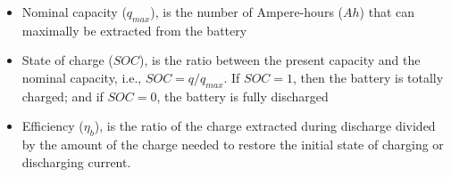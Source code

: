 \documentclass[journal]{IEEEtran}
\begin{document}
\begin{itemize}
\item Nominal capacity ($ q_{max} $), is the number of Ampere-hours ($ Ah $) that can maximally be extracted from the battery
\item State of charge ($ SOC $), is the ratio between the present capacity and the nominal capacity, i.e., $ SOC = q/q_{max} $. 
If $ SOC=1 $, then the battery is totally charged; and if $ SOC=0 $, the battery is fully discharged
\item Efficiency ($\eta_{b}$), is the ratio of the charge extracted during discharge divided by the amount of the charge needed to restore the initial state of charging or discharging current. 
\end{itemize}
\end{document}
